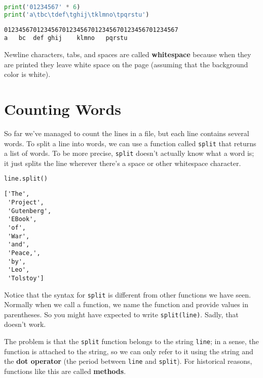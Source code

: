 \begin{lstlisting}[language=Python,style=source]
print('01234567' * 6)
print('a\tbc\tdef\tghij\tklmno\tpqrstu')
\end{lstlisting}

\begin{lstlisting}[style=output]
012345670123456701234567012345670123456701234567
a   bc  def ghij    klmno   pqrstu
\end{lstlisting}

Newline characters, tabs, and spaces are called \textbf{whitespace}
because when they are printed they leave white space on the page
(assuming that the background color is white).

\hypertarget{counting-words}{%
\section{Counting Words}\label{counting-words}}

So far we've managed to count the lines in a file, but each line
contains several words. To split a line into words, we can use a
function called \passthrough{\lstinline!split!} that returns a list of
words. To be more precise, \passthrough{\lstinline!split!} doesn't
actually know what a word is; it just splits the line wherever there's a
space or other whitespace character.

\begin{lstlisting}[language=Python,style=source]
line.split()
\end{lstlisting}

\begin{lstlisting}[style=output]
['The',
 'Project',
 'Gutenberg',
 'EBook',
 'of',
 'War',
 'and',
 'Peace,',
 'by',
 'Leo',
 'Tolstoy']
\end{lstlisting}

Notice that the syntax for \passthrough{\lstinline!split!} is different
from other functions we have seen. Normally when we call a function, we
name the function and provide values in parentheses. So you might have
expected to write \passthrough{\lstinline!split(line)!}. Sadly, that
doesn't work.

The problem is that the \passthrough{\lstinline!split!} function belongs
to the string \passthrough{\lstinline!line!}; in a sense, the function
is attached to the string, so we can only refer to it using the string
and the \textbf{dot operator} (the period between
\passthrough{\lstinline!line!} and \passthrough{\lstinline!split!}). For
historical reasons, functions like this are called \textbf{methods}.

